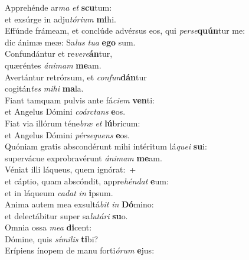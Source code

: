 \evenverse Apprehénde ar\textit{ma} \textit{et} \textbf{scu}tum:~\*\\
\evenverse et exsúrge in adju\textit{tó}\textit{ri}\textit{um} \textbf{mi}hi.\\
\oddverse Effúnde frámeam, et conclúde advérsus eos, qui \textit{per}\textit{se}\textbf{quún}tur me:~\*\\
\oddverse dic ánimæ meæ: Sa\textit{lus} \textit{tu}\textit{a} \textbf{e}\textbf{go} sum.\\
\evenverse Confundántur et re\textit{ve}\textit{re}\textbf{án}tur,~\*\\
\evenverse quæréntes \textit{á}\textit{ni}\textit{mam} \textbf{me}am.\\
\oddverse Avertántur retrórsum, et \textit{con}\textit{fun}\textbf{dán}tur~\*\\
\oddverse cogitán\textit{tes} \textit{mi}\textit{hi} \textbf{ma}la.\\
\evenverse Fiant tamquam pulvis ante fá\textit{ci}\textit{em} \textbf{ven}ti:~\*\\
\evenverse et Angelus Dómini \textit{co}\textit{ár}\textit{ctans} \textbf{e}os.\\
\oddverse Fiat via illórum téne\textit{bræ} \textit{et} \textbf{lú}bricum:~\*\\
\oddverse et Angelus Dómini \textit{pér}\textit{se}\textit{quens} \textbf{e}os.\\
\evenverse Quóniam gratis abscondérunt mihi intéritum lá\textit{que}\textit{i} \textbf{su}i:~\*\\
\evenverse supervácue exprobravérunt \textit{á}\textit{ni}\textit{mam} \textbf{me}am.\\
\oddverse Véniat illi láqueus, quem ignórat:~+\\
\oddverse  et cáptio, quam abscóndit, appre\textit{hén}\textit{dat} \textbf{e}um:~\*\\
\oddverse et in láqueum \textit{ca}\textit{dat} \textit{in} \textbf{i}psum.\\
\evenverse Anima autem mea exsultá\textit{bit} \textit{in} \textbf{Dó}mino:~\*\\
\evenverse et delectábitur super sa\textit{lu}\textit{tá}\textit{ri} \textbf{su}o.\\
\oddverse Omnia ossa \textit{me}\textit{a} \textbf{di}cent:~\*\\
\oddverse Dómine, quis \textit{sí}\textit{mi}\textit{lis} \textbf{ti}bi?\\
\evenverse Erípiens ínopem de manu forti\textit{ó}\textit{rum} \textbf{e}jus:~\*\\
